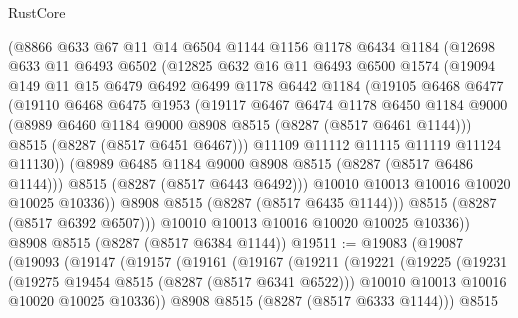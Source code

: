 \begin{lexlean}{RustCore}
\begin{coremodule}
          (@8866
            @633
            @67
            @11
            @14
            @6504
            @1144
            @1156
            @1178
            @6434
            @1184
            (@12698
              @633
              @11
              @6493
              @6502
              (@12825
                @632
                @16
                @11
                @6493
                @6500
                @1574
                (@19094
                  @149
                  @11
                  @15
                  @6479
                  @6492
                  @6499
                  @1178
                  @6442
                  @1184
                  (@19105
                    @6468
                    @6477
                    (@19110
                      @6468
                      @6475
                      @1953
                      (@19117
                        @6467
                        @6474
                        @1178
                        @6450
                        @1184
                        @9000
                        (@8989 @6460 @1184 @9000 @8908 @8515 (@8287 (@8517 @6461 @1144)))
                        @8515
                        (@8287 (@8517 @6451 @6467)))
                      @11109
                      @11112
                      @11115
                      @11119
                      @11124
                      @11130))
                  (@8989 @6485 @1184 @9000 @8908 @8515 (@8287 (@8517 @6486 @1144)))
                  @8515
                  (@8287 (@8517 @6443 @6492)))
                @10010
                @10013
                @10016
                @10020
                @10025
                @10336))
            @8908
            @8515
            (@8287 (@8517 @6435 @1144)))
          @8515
          (@8287 (@8517 @6392 @6507)))
        @10010
        @10013
        @10016
        @10020
        @10025
        @10336))
    @8908
    @8515
    (@8287 (@8517 @6384 @1144))
@19511 := @19083
    (@19087
      (@19093
        (@19147
          (@19157
            (@19161
              (@19167
                (@19211
                  (@19221
                    (@19225
                      (@19231
                        (@19275 @19454 @8515 (@8287 (@8517 @6341 @6522)))
                        @10010
                        @10013
                        @10016
                        @10020
                        @10025
                        @10336))
                    @8908
                    @8515
                    (@8287 (@8517 @6333 @1144)))
                  @8515

\end{coremodule}
\end{lexlean}
